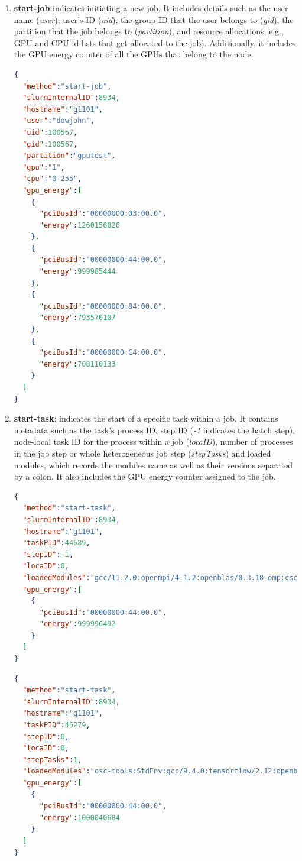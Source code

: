 \begin{enumerate}
    \item \textbf{start-job} indicates initiating a new job. It includes details such as the user name (\textit{user}), user's ID (\textit{uid}), the group ID that the user belongs to (\textit{gid}), the partition that the job belongs to (\textit{partition}), and resource allocations, e.g., GPU and CPU id lists that get allocated to the job). Additionally, it includes the GPU energy counter of all the GPUs that belong to the node.

\clearpage

\begin{lstlisting}[language=JSON]
{
  "method":"start-job",
  "slurmInternalID":8934,
  "hostname":"g1101",
  "user":"dowjohn",
  "uid":100567,
  "gid":100567,
  "partition":"gputest",
  "gpu":"1",
  "cpu":"0-255",
  "gpu_energy":[
    {
      "pciBusId":"00000000:03:00.0",
      "energy":1260156826
    },
    {
      "pciBusId":"00000000:44:00.0",
      "energy":999985444
    },
    {
      "pciBusId":"00000000:84:00.0",
      "energy":793570107
    },
    {
      "pciBusId":"00000000:C4:00.0",
      "energy":708110133
    }
  ]
}
\end{lstlisting}

    \item \textbf{start-task}: indicates the start of a specific task within a job. It contains metadata such as the task's process ID, step ID (\textit{-1} indicates the batch step), node-local task ID for the process within a job (\textit{locaID}), number of processes in the job step or whole heterogeneous job step (\textit{stepTasks}) and loaded modules, which records the modules name as well as their versions separated by a colon. It also includes the GPU energy counter assigned to the job.

\clearpage

\begin{lstlisting}[language=JSON]
{
  "method":"start-task",
  "slurmInternalID":8934,
  "hostname":"g1101",
  "taskPID":44689,
  "stepID":-1,
  "locaID":0,
  "loadedModules":"gcc/11.2.0:openmpi/4.1.2:openblas/0.3.18-omp:csc-tools:StdEnv",
  "gpu_energy":[
    {
      "pciBusId":"00000000:44:00.0",
      "energy":999996492
    }
  ]
}
\end{lstlisting}

\begin{lstlisting}[language=JSON]
{
  "method":"start-task",
  "slurmInternalID":8934,
  "hostname":"g1101",
  "taskPID":45279,
  "stepID":0,
  "locaID":0,
  "stepTasks":1,
  "loadedModules":"csc-tools:StdEnv:gcc/9.4.0:tensorflow/2.12:openblas/0.3.18-omp:openmpi/4.1.2:cuda/11.5.0",
  "gpu_energy":[
    {
      "pciBusId":"00000000:44:00.0",
      "energy":1000040684
    }
  ]
}
\end{lstlisting}


\end{enumerate}
